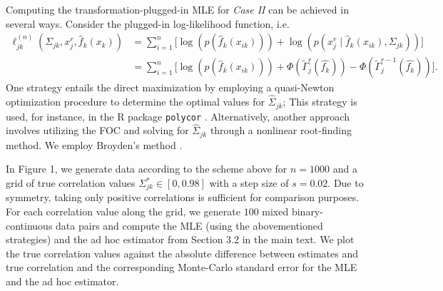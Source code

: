 \begin{change}
    Computing the transformation-plugged-in MLE for \textit{Case II} can be achieved in several ways. Consider the plugged-in log-likelihood function, i.e.
    \begin{equation*}
        \begin{split}
            \ell_{jk}^{(n)}(\Sigma_{jk}, x_j^r,\hat{f}_k(x_k)) & = \sum_{i=1}^n \big[\log(p(\hat{f}_k(x_{ik}))) + \log(p(x_{j}^{r} \mid \hat{f}_k(x_{ik}), \Sigma_{jk}))\big]                      \\
            & = \sum_{i=1}^n \big[\log(p(\hat{f}_k(x_{ik}))) + \Phi(\tilde{\Gamma}_j^{r}(\hat{f_k})) - \Phi(\tilde{\Gamma}_j^{r-1}(\hat{f_k}))\big].
        \end{split}
    \end{equation*}
    One strategy entails the direct maximization by employing a quasi-Newton optimization procedure to determine the optimal values for $\hat\Sigma_{jk}$; This strategy is used, for instance, in the R package \texttt{polycor} \citep{polycor2022}. Alternatively, another approach involves utilizing the FOC and solving for $\hat\Sigma_{jk}$ through a nonlinear root-finding method. We employ Broyden's method \citep{Broyden1965}.

    In Figure 1, we generate data according to the scheme above for \(n=1000\) and a grid of true correlation values \(\Sigma^*_{jk} \in [0, 0.98]\) with a step size of \(s=0.02\). Due to symmetry, taking only positive correlations is sufficient for comparison purposes. For each correlation value along the grid, we generate \(100\) mixed binary-continuous data pairs and compute the MLE (using the abovementioned strategies) and the ad hoc estimator from Section 3.2 in the main text. We plot the true correlation values against the absolute difference between estimates and true correlation and the corresponding Monte-Carlo standard error for the MLE and the ad hoc estimator.


\end{change}
